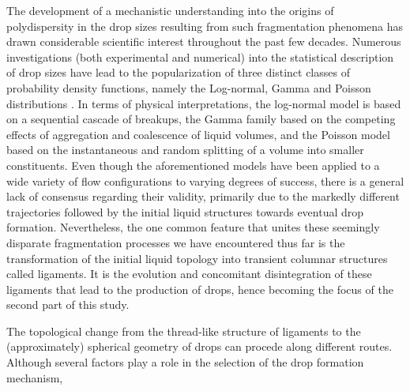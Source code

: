 The development of a mechanistic understanding into the origins of polydispersity in the drop sizes  
resulting from such fragmentation phenomena has drawn considerable scientific interest throughout the past few decades.
Numerous investigations (both experimental and numerical) into the statistical description of drop sizes
have lead to the popularization of three distinct classes of probability density functions, 
namely the Log-normal, Gamma and Poisson distributions \cite{vill_1}.  
In terms of physical interpretations, the log-normal model \cite{log_normal} is based on a sequential cascade
of breakups, the Gamma family \cite{vill_2} based on the competing effects of aggregation and coalescence of liquid volumes, 
and the Poisson model \cite{poisson} based on the instantaneous and random splitting of a volume into smaller constituents.  
Even though the aforementioned models have been applied to a wide variety of flow configurations
to varying degrees of success, there is a general lack of consensus regarding their validity, primarily 
due to the markedly different trajectories  
followed by the initial liquid structures towards eventual drop formation. 
Nevertheless, the one common feature that unites these seemingly disparate fragmentation processes 
we have encountered thus far is the transformation of the initial liquid topology into transient columnar 
structures called ligaments. It is the evolution and concomitant disintegration of these ligaments 
that lead to the production of drops, hence becoming the focus of the second part of this study. 

The topological change from the thread-like structure of ligaments to the 
(approximately) spherical geometry of drops can procede along different routes.
Although several factors play a role in the selection of the drop formation mechanism,
 




















































